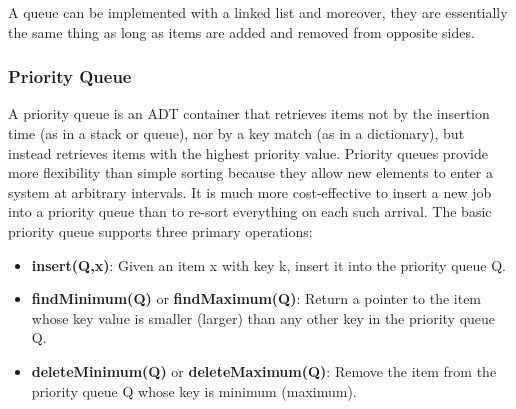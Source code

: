 \documentclass{article}
\begin{document}
    A queue can be implemented with a linked list and moreover, they are essentially the same thing as long as items are added and removed from opposite sides.
    
    \subsubsection{Priority Queue}
    A priority queue is an ADT container that retrieves items not by the insertion time (as in a stack or queue), nor by a key match (as in a dictionary), but instead retrieves items with the highest priority value. Priority queues provide more flexibility than simple sorting because they allow new elements to enter a system at arbitrary intervals. It is much more cost-effective to insert a new job into a priority queue than to re-sort everything on each such arrival. The basic priority queue supports three primary operations:
    \begin{itemize}
        \item \textbf{insert(Q,x)}: Given an item x with key k, insert it into the priority queue Q.
        \item \textbf{findMinimum(Q)} or \textbf{findMaximum(Q)}: Return a pointer to the item whose key value is smaller (larger) than any other key in the priority queue Q.
        \item \textbf{deleteMinimum(Q)} or \textbf{deleteMaximum(Q)}: Remove the item from the priority queue Q whose key is minimum (maximum).
    \end{itemize}
\end{document}
